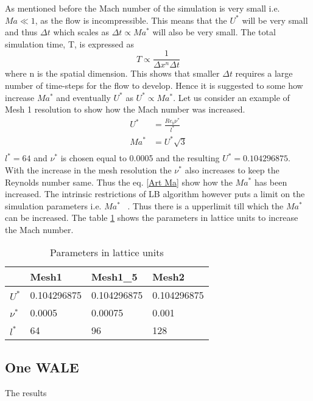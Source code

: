As mentioned before the Mach number of the simulation is very small i.e. $Ma\ll 1$, as the flow is incompressible. This means that the $U^*$ will be very small and thus $\Delta t$ which scales as $\Delta t \propto Ma^*$ will also be very small. The total simulation time, T, is expressed as ~\cite{krueger:book} $$ T \propto \frac{1}{\Delta x^n \Delta t}$$
where n is the spatial dimension. This shows that smaller $\Delta t$ requires a large number of time-steps for the flow to develop. Hence it is suggested to some how increase $Ma^*$ and eventually $U^*$ as $U^* \propto Ma^*$.
Let us consider an example of Mesh 1 resolution to show how the Mach number was increased. 
\begin{equation}
\label{Art Ma}
\begin{split}
U^* &= \frac{Re_b \nu^*}{l^*}\\
Ma^* &= {U^*}{\sqrt{3}}\\
\end{split}
\end{equation}
%
$l^* = 64$ and $\nu^*$ is chosen equal to 0.0005 and the resulting $U^* = 0.104296875
$. With the increase in the mesh resolution the $\nu^*$ also increases to keep the Reynolds number same. Thus the eq. \ref{Art Ma} show how the $Ma^*$ has been increased. The intrinsic restrictions of LB algorithm however puts a limit on the simulation parameters i.e. $Ma^*$ ~\cite{krueger:book}. Thus there is a upperlimit till which the $Ma^*$ can be increased. The table \ref{P in LB} shows the parameters in lattice units to increase the Mach number.
%
\begin{table}[h!]
\begin{center}
\begin{tabular}{ p{2cm}|p{2cm}p{2cm}p{2cm}  } 
\hline
 & Mesh1 & Mesh1\_5 & Mesh2 \\
  \hline
  \multirow{1}{6em}{$U^*$}  & 0.104296875 & 0.104296875 & 0.104296875\\
  \hline
  \multirow{1}{6em}{$\nu^*$} & 0.0005 & 0.00075 & 0.001\\
  \hline
  \multirow{1}{6em}{$l^*$} & 64 & 96 & 128\\
  \hline
\end{tabular}
\end{center}
\caption{Parameters in lattice units}
\label{P in LB}
\end{table}
%

\subsection{One WALE} \label{One wale}

The results 

